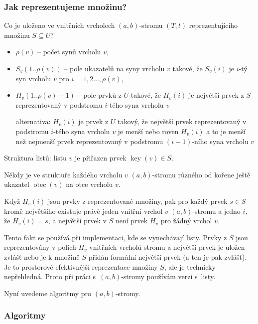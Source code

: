 \documentclass[a4paper,12pt]{article}
\newenvironment{pitemize}{
 \begin{itemize}
   \setlength{\itemsep}{1pt}
   \setlength{\parskip}{0pt}
   \setlength{\parsep}{0pt}
 }{\end{itemize}}
\DeclareMathOperator*{\otec}{otec}
\DeclareMathOperator*{\key}{key}
\begin{document}
\subsubsection{Jak reprezentujeme množinu?}
Co je uloženo ve vnitřních vrcholech $(a,b)$-stromu $(T,t)$ reprezentující\-ho množinu 
$S\subseteq U$?
\begin{pitemize}
\item$\rho (v)$ -- počet synů vrcholu $v$, 
\item$S_v(1..\rho (v))$ -- pole ukazatelů na syny vrcholu $v$ takové, 
že $S_v(i)$ je $i$-tý syn vrcholu $v$ pro 
$i=1,2\dots,\rho (v)$, 
\item$H_v(1..\rho (v)-1)$ -- pole prvků z $U$ takové, že $
H_v(i)$ 
je největší prvek z $S$ reprezentovaný v podstromu 
$i$-tého syna vrcholu $v$ 

alternativa: $H_v(i)$ je prvek z $U$ 
takový, že největší prvek reprezentovaný v podstromu $
i$-tého 
syna vrcholu $v$ je menší nebo roven $H_v(i)$ a to je menší  
než nejmenší prvek reprezentovaný v podstromu $(i+1)$-ního 
syna vrcholu $v$
\end{pitemize}
Struktura listů:\newline 
listu $v$ je přiřazen prvek $\key(v)\in S$.

Někdy je ve struktuře každého vrcholu $v$ 
$(a,b)$-stromu různého od kořene ještě ukazatel 
$\otec(v)$ na otce vrcholu $v$.

\begin{pozorovani}
Když $H_v(i)$ jsou prvky z reprezentované 
množiny, pak pro každý prvek $s\in S$ kromě největšího 
existuje právě jeden vnitř\-ní vrchol $v$ $(a,b)$-stromu 
a jedno $i$, že $H_v(i)=s$, a největší prvek v $S$ není prvek 
$H_v$ pro žádný vrchol $v$. 
\end{pozorovani}

Tento fakt se používá při 
implementaci, kde se vynechávají listy. Prvky z $S$ jsou 
reprezentovány v polích $H_v$ vnitř\-ních vrcholů 
stromu 
a největší prvek je uložen zvlášť nebo je k množině $S$ přidán 
formální největší prvek (a ten je pak  zvlášť). Je to prostorově 
efektivnější reprezentace množiny $S$, ale je technicky 
nepřehledná. Proto při práci s~$(a,b)$-stromy používám 
verzi s~listy.

Nyní uvedeme algoritmy pro $(a,b)$-stromy.

\subsubsection{Algoritmy}
\end{document}
